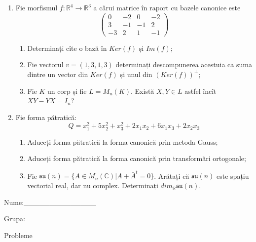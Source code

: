 \documentclass{article}
\begin{document}
\begin{enumerate}
 \item Fie morfismul $f:\mathbb{R}^4 \to \mathbb{R}^3$ a cărui matrice în raport cu bazele canonice este
$$\begin{pmatrix}
0&-2&0&-2\\
3&-1&-1&2\\
-3&2&1&-1
\end{pmatrix}$$

\begin{enumerate}
\item Determinați cîte o bază în $Ker(f)$ și $Im(f)$;
\item Fie vectorul $v=(1,3,1,3)$ determinați descompunerea acestuia ca suma dintre un vector din $Ker(f)$ și unul din $(Ker(f))^\perp$;
\item Fie $K$ un corp și fie $L=M_n(K)$. Există $X,Y \in L$ astfel încît $XY-YX=I_n$?  
\end{enumerate}
\item Fie forma pătratică:
$$Q= x_1^2+5x_2^2+x_3^2+2x_1x_2+6x_1x_3+2x_2x_3$$

\begin{enumerate}
\item Aduceți forma pătratică la forma canonică prin metoda Gauss;
\item Aduceți forma pătratică la forma canonică prin transformări ortogonale;
\item Fie $\mathfrak{su}(n)=\{ A \in M_n(\mathbb{C}) | A+\bar{A}^t=0\}$. Arătați că $\mathfrak{su}(n)$ este spațiu vectorial real, dar nu complex.
Determinați $dim_{\mathbb{R}}\mathfrak{su}(n)$.
\end{enumerate}
\end{enumerate}
\newpage
\begin{flushright}
Nume:\_\_\_\_\_\_\_\_\_\_\_\_\_\_
 
 
Grupa:\_\_\_\_\_\_\_\_\_\_\_\_\_\_
\end{flushright}
\begin{center}
\vspace{2cm}
{\Large Probleme}
\vspace{2cm}
\end{center}
\end{document}
